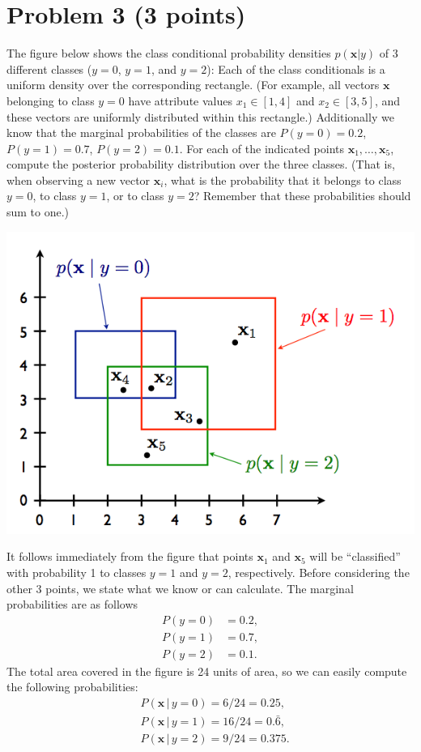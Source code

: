 \documentclass[10pt]{article}
\begin{document}
\section*{Problem 3 (3 points)}
The figure below shows the class conditional probability densities $p(\textbf{x} | y)$ of 3 different classes ($y = 0$, $y = 1$, and $y = 2$): Each of the class conditionals is a uniform density over the corresponding rectangle. (For example, all vectors $\textbf{x}$ belonging to class $y = 0$ have attribute values $x_1 \in [1, 4]$ and $x_2 \in [3, 5]$, and these vectors are uniformly distributed within this rectangle.) Additionally we know that the marginal probabilities of the classes are $P(y = 0) = 0.2$, $P(y = 1) = 0.7$, $P(y = 2) = 0.1$. For each of the indicated points $\textbf{x}_1, \dots, \textbf{x}_5$, compute the posterior probability distribution over the three classes. (That is, when observing a new vector $\textbf{x}_i$, what is the probability that it belongs to class $y = 0$, to class $y = 1$, or to class $y = 2$? Remember that these probabilities should sum to one.)

\includegraphics[width=\textwidth,keepaspectratio]{rectangles}

\color{black}
\noindent It follows immediately from the figure that points $\textbf{x}_1$ and $\textbf{x}_5$ will be ``classified'' with probability 1 to classes $y = 1$ and $y = 2$, respectively. Before considering the other 3 points, we state what we know or can calculate. The marginal probabilities are as follows
\begin{align*}
P(y = 0) &= 0.2, \\
P(y = 1) &= 0.7, \\
P(y = 2) &= 0.1.
\end{align*}
The total area covered in the figure is 24 units of area, so we can easily compute the following probabilities:
\begin{align*}
&P(\textbf{x} \, | \, y = 0) = 6 / 24 = 0.25, \\
&P(\textbf{x} \, | \, y = 1) = 16 / 24 = 0.\bar{6}, \\
&P(\textbf{x} \, | \, y = 2) = 9 / 24 = 0.375. 
\end{align*}
\end{document}
